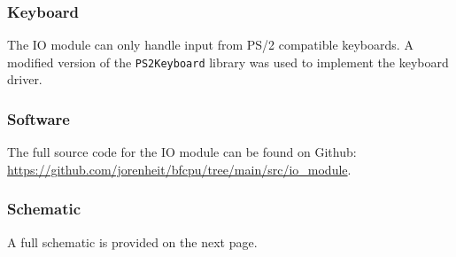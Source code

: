 \subsubsection{Keyboard}
The IO module can only handle input from PS/2 compatible keyboards. A modified version of the \texttt{PS2Keyboard} library was used to implement the keyboard driver.

\subsubsection{Software}
The full source code for the IO module can be found on Github: \url{https://github.com/jorenheit/bfcpu/tree/main/src/io_module}.

\subsubsection{Schematic}
A full schematic is provided on the next page.

